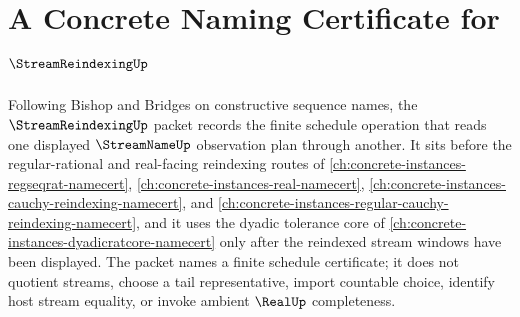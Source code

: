 \chapter{A Concrete Naming Certificate for $\StreamReindexingUp$}
\label{ch:concrete-instances-stream-reindexing-namecert}

Following Bishop and Bridges on constructive sequence names, the $\StreamReindexingUp$ packet records the finite schedule operation that reads one displayed $\StreamNameUp$ observation plan through another. It sits before the regular-rational and real-facing reindexing routes of \autoref{ch:concrete-instances-regseqrat-namecert}, \autoref{ch:concrete-instances-real-namecert}, \autoref{ch:concrete-instances-cauchy-reindexing-namecert}, and \autoref{ch:concrete-instances-regular-cauchy-reindexing-namecert}, and it uses the dyadic tolerance core of \autoref{ch:concrete-instances-dyadicratcore-namecert} only after the reindexed stream windows have been displayed. The packet names a finite schedule certificate; it does not quotient streams, choose a tail representative, import countable choice, identify host stream equality, or invoke ambient $\RealUp$ completeness.

